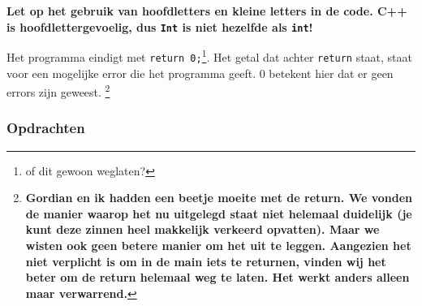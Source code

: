\documentclass[12pt,a4paper]{article}
\newcommand{\icode}{\lstinline}
\begin{document}
\textbf{Let op het gebruik van hoofdletters en kleine letters in de code. C++ is hoofdlettergevoelig, dus \icode{Int} is niet hezelfde als \icode{int}!}


Het programma eindigt met \icode{return 0;}\footnote{of dit gewoon weglaten?}. Het getal dat achter \icode{return} staat, staat voor een mogelijke error die het programma geeft. 0 betekent hier dat er geen errors zijn geweest. \footnote{\textbf{Gordian en ik hadden een beetje moeite met de return. We vonden de manier waarop het nu uitgelegd staat niet helemaal duidelijk (je kunt deze zinnen heel makkelijk verkeerd opvatten). Maar we wisten ook geen betere manier om het uit te leggen. Aangezien het niet verplicht is om in de main iets te returnen, vinden wij het beter om de return helemaal weg te laten. Het werkt anders alleen maar verwarrend.}}
\subsubsection{Opdrachten}
\end{document}
